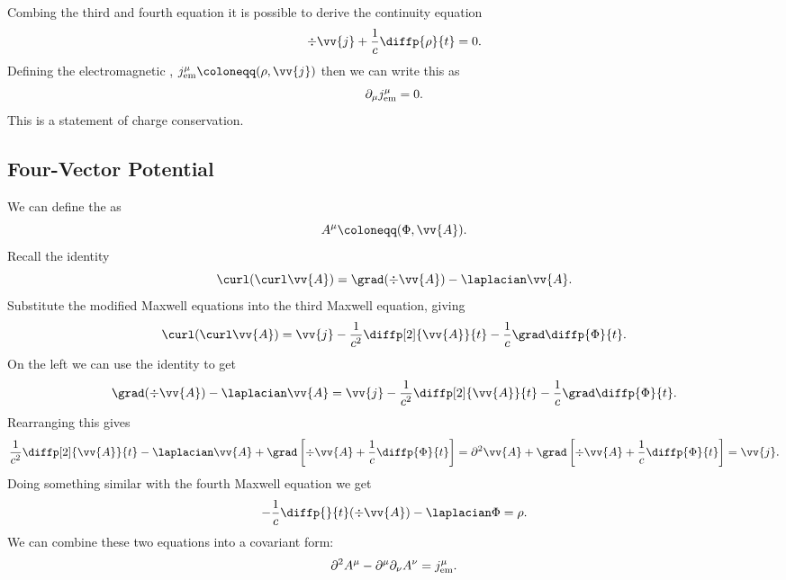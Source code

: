 Combing the third and fourth equation it is possible to derive the continuity equation
\begin{equation}
    \div\vv{j} + \frac{1}{c}\diffp{\rho}{t} = 0.
\end{equation}
Defining the electromagnetic , \(j_{\EM}^{\mu} \coloneqq (\rho, \vv{j})\) then we can write this as
\begin{equation}
    \partial_\mu j_{\text{em}}^\mu = 0.
\end{equation}
This is a statement of charge conservation.

\subsection{Four-Vector Potential}
We can define the  as
\begin{equation}
    A^\mu \coloneqq (\Phi, \vv{A}).
\end{equation}
Recall the identity
\begin{equation}
    \curl (\curl \vv{A}) = \grad(\div\vv{A}) - \laplacian\vv{A}.
\end{equation}
Substitute the modified Maxwell equations into the third Maxwell equation, giving
\begin{equation}
    \curl(\curl \vv{A}) = \vv{j} - \frac{1}{c^2}\diffp[2]{\vv{A}}{t} - \frac{1}{c} \grad \diffp{\Phi}{t}.
\end{equation}
On the left we can use the identity to get
\begin{equation}
    \grad(\div\vv{A}) - \laplacian\vv{A} = \vv{j} - \frac{1}{c^2}\diffp[2]{\vv{A}}{t} - \frac{1}{c} \grad \diffp{\Phi}{t}.
\end{equation}
Rearranging this gives
\begin{equation}
    \frac{1}{c^2}\diffp[2]{\vv{A}}{t} - \laplacian\vv{A} + \grad\left[ \div\vv{A} + \frac{1}{c}\diffp{\Phi}{t} \right] = \dalembertian\vv{A} + \grad\left[ \div\vv{A} + \frac{1}{c}\diffp{\Phi}{t} \right] = \vv{j}.
\end{equation}
Doing something similar with the fourth Maxwell equation we get
\begin{equation}
    -\frac{1}{c}\diffp{}{t}(\div\vv{A}) - \laplacian\Phi = \rho.
\end{equation}
We can combine these two equations into a covariant form:
\begin{equation}\label{eqn:dalembertian Amu - partial mu partial nu Anu = jmu}
    \partial^2 A^\mu - \partial^\mu \partial_\nu A^\nu = j_{\text{em}}^\mu.
\end{equation}

